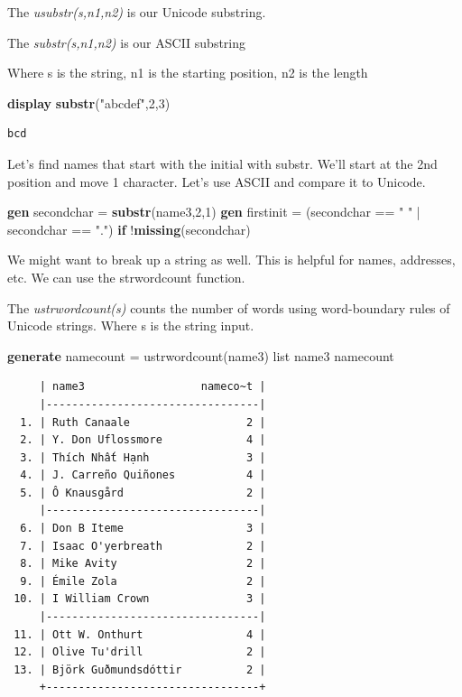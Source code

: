 \documentclass[
]{book}
\newenvironment{Shaded}{\begin{snugshade}}{\end{snugshade}}
\newcommand{\FunctionTok}[1]{\textcolor[rgb]{0.13,0.29,0.53}{\textbf{#1}}}
\newcommand{\KeywordTok}[1]{\textcolor[rgb]{0.13,0.29,0.53}{\textbf{#1}}}
\newcommand{\NormalTok}[1]{#1}
\newcommand{\OtherTok}[1]{\textcolor[rgb]{0.56,0.35,0.01}{#1}}
\newcommand{\StringTok}[1]{\textcolor[rgb]{0.31,0.60,0.02}{#1}}
\begin{document}
The \emph{usubstr(s,n1,n2)} is our Unicode substring.

The \emph{substr(s,n1,n2)} is our ASCII substring

Where s is the string, n1 is the starting position, n2 is the length

\begin{Shaded}
\begin{Highlighting}[]
    \KeywordTok{display} \FunctionTok{substr}\NormalTok{(}\StringTok{"abcdef"}\NormalTok{,2,3)}
\end{Highlighting}
\end{Shaded}

\begin{verbatim}
bcd
\end{verbatim}

Let's find names that start with the initial with substr. We'll start at the 2nd position and move 1 character. Let's use ASCII and compare it to Unicode.

\begin{Shaded}
\begin{Highlighting}[]
\KeywordTok{gen}\NormalTok{ secondchar = }\FunctionTok{substr}\NormalTok{(name3,2,1)}
\KeywordTok{gen}\NormalTok{ firstinit = (secondchar == }\StringTok{" "}\NormalTok{ | secondchar == }\StringTok{"."}\NormalTok{) }\KeywordTok{if}\NormalTok{ !}\FunctionTok{missing}\NormalTok{(secondchar)}
\end{Highlighting}
\end{Shaded}

We might want to break up a string as well. This is helpful for names, addresses, etc.
We can use the strwordcount function.

The \emph{ustrwordcount(s)} counts the number of words using word-boundary rules of Unicode strings. Where s is the string input.

\begin{Shaded}
\begin{Highlighting}[]
\KeywordTok{generate}\NormalTok{ namecount = ustrwordcount(name3)}
\OtherTok{list}\NormalTok{ name3 namecount}
\end{Highlighting}
\end{Shaded}

\begin{verbatim}
     | name3                  nameco~t |
     |---------------------------------|
  1. | Ruth Canaale                  2 |
  2. | Y. Don Uflossmore             4 |
  3. | Thích Nhất Hạnh               3 |
  4. | J. Carreño Quiñones           4 |
  5. | Ô Knausgård                   2 |
     |---------------------------------|
  6. | Don B Iteme                   3 |
  7. | Isaac O'yerbreath             2 |
  8. | Mike Avity                    2 |
  9. | Émile Zola                    2 |
 10. | I William Crown               3 |
     |---------------------------------|
 11. | Ott W. Onthurt                4 |
 12. | Olive Tu'drill                2 |
 13. | Björk Guðmundsdóttir          2 |
     +---------------------------------+
\end{verbatim}
\end{document}
